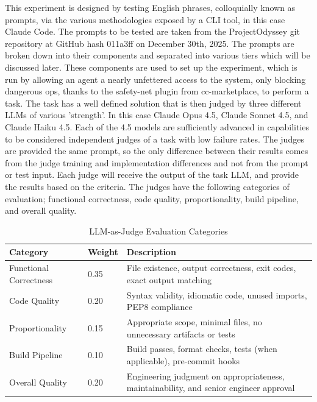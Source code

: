 \documentclass[11pt]{article}
\begin{document}
This experiment is designed by testing English phrases, colloquially known as
prompts, via the various methodologies exposed by a CLI tool, in this case
Claude Code. The prompts to be tested are taken from the ProjectOdyssey\cite{projectodyssey} git
repository at GitHub hash 011a3ff on December 30th, 2025. The prompts are broken
down into their components and separated into various tiers which will be
discussed later. These components are used to set up the experiment, which is run
by allowing an agent a nearly unfettered access to the system, only blocking
dangerous ops, thanks to the safety-net plugin\cite{safetynet} from cc-marketplace\cite{ccmarketplace}, to
perform a task. The task has a well defined solution that is then judged by
three different LLMs of various 'strength'. In this case Claude Opus 4.5,
Claude Sonnet 4.5, and Claude Haiku 4.5. Each of the 4.5 models are sufficiently
advanced in capabilities to be considered independent judges of a task with low
failure rates. The judges are provided the same prompt, so the only difference
between their results comes from the judge training and implementation
differences and not from the prompt or test input. Each judge will receive the
output of the task LLM, and provide the results based on the criteria. The
judges have the following categories of evaluation; functional correctness, code
quality, proportionality, build pipeline, and overall quality.

\begin{table}[htbp]
\centering
\caption{LLM-as-Judge Evaluation Categories}
\begin{tabularx}{\textwidth}{llX}
\toprule
Category & Weight & Description \\
\midrule
Functional Correctness & 0.35 & File existence, output correctness, exit codes, exact output matching \\
Code Quality & 0.20 & Syntax validity, idiomatic code, unused imports, PEP8 compliance  \\
Proportionality & 0.15 & Appropriate scope, minimal files, no unnecessary artifacts or tests  \\
Build Pipeline & 0.10 & Build passes, format checks, tests (when applicable), pre-commit hooks  \\
Overall Quality & 0.20 & Engineering judgment on appropriateness, maintainability, and senior engineer approval \\
\bottomrule
\end{tabularx}
\end{table}
\end{document}
